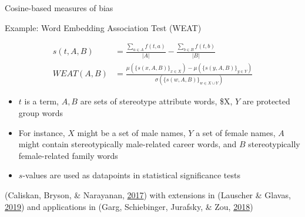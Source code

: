 \documentclass[10pt,ignorenonframetext,x11names, dvipsnames, bibspacing,natbib]{beamer}
\begin{document}
\begin{frame}{Cosine-based measures of bias}

\begin{block}{Example: Word Embedding Association Test (WEAT)}

\begin{align*}
s(t,A,B) & = \frac{\sum_{a\in A}f(t,a)}{\vert A\vert} - \frac{\sum_{b\in B}f(t,b)}{\vert B\vert}
\\
WEAT(A,B) & = \frac{
\mu\left(\{s(x,A,B)\}_{x\in X}\right) -\mu\left(\{s(y,A,B)\}_{y\in Y}\right) 
}{
\sigma\left(\{s(w,A,B)\}_{w\in X\cup Y}\right)
}
\end{align*}

\begin{itemize}
\item
  \(t\) is a term, \(A, B\) are sets of stereotype attribute words, \$X,
  \(Y\) are protected group words
\item
  For instance, \(X\) might be a set of male names, \(Y\) a set of
  female names, \(A\) might contain stereotypically male-related career
  words, and \(B\) stereotypically female-related family words
\item
  \(s\)-values are used as datapoints in statistical significance tests
\end{itemize}

\footnotesize

(Caliskan, Bryson, \& Narayanan,
\protect\hyperlink{ref-Caliskan2017semanticsBiases}{2017}) with
extensions in (Lauscher \& Glavas,
\protect\hyperlink{ref-Lauscher2019multidimensional}{2019}) and
applications in (Garg, Schiebinger, Jurafsky, \& Zou,
\protect\hyperlink{ref-Garg2018years}{2018})

\end{block}

\end{frame}
\end{document}
